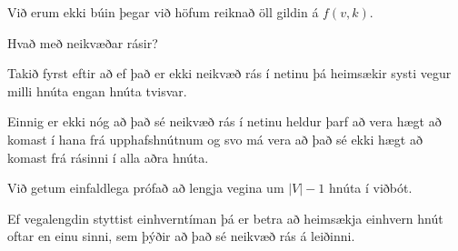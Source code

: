 {
	{
		\item<1-> Við erum ekki búin þegar við höfum reiknað öll gildin á $f(v, k)$.
		\item<2-> Hvað með neikvæðar rásir?
		\item<3-> Takið fyrst eftir að ef það er ekki neikvæð rás í netinu þá heimsækir systi vegur milli hnúta engan hnúta tvisvar.
		\item<4-> Einnig er ekki nóg að það sé neikvæð rás í netinu heldur þarf að vera hægt að komast í hana frá upphafshnútnum
					og svo má vera að það sé ekki hægt að komast frá rásinni í alla aðra hnúta.
		\item<5-> Við getum einfaldlega prófað að lengja vegina um $|V| - 1$ hnúta í viðbót.
		\item<6-> Ef vegalengdin styttist einhverntíman þá er betra að heimsækja einhvern hnút oftar en einu sinni,
					sem þýðir að það sé neikvæð rás á leiðinni.
	}
}

